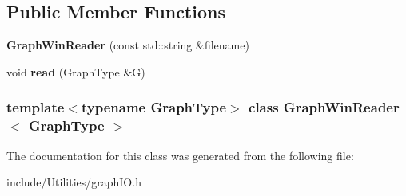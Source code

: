 \subsection*{Public Member Functions}
\begin{DoxyCompactItemize}
\item 
\hypertarget{class_graph_win_reader_a69906d5182d6222b0899f94f3922e5bc}{
{\bfseries GraphWinReader} (const std::string \&filename)}
\label{class_graph_win_reader_a69906d5182d6222b0899f94f3922e5bc}

\item 
\hypertarget{class_graph_win_reader_a657fd638fb8564352b3f5a7d1f0a4ccf}{
void {\bfseries read} (GraphType \&G)}
\label{class_graph_win_reader_a657fd638fb8564352b3f5a7d1f0a4ccf}

\end{DoxyCompactItemize}
\subsubsection*{template$<$typename GraphType$>$ class GraphWinReader$<$ GraphType $>$}



The documentation for this class was generated from the following file:\begin{DoxyCompactItemize}
\item 
include/Utilities/graphIO.h\end{DoxyCompactItemize}

